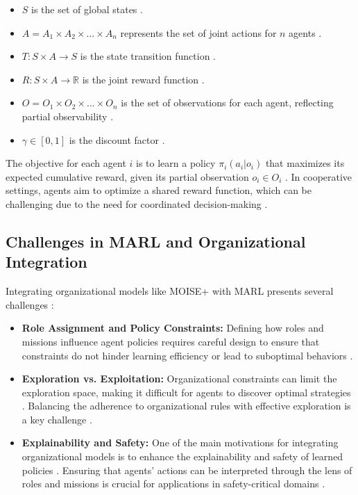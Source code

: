 \documentclass[sigconf,anonymous]{aamas}
\begin{document}
\begin{itemize}
    \item $S$ is the set of global states \cite{oliehoek2016concise}.
    \item $A = A_1 \times A_2 \times ... \times A_n$ represents the set of joint actions for $n$ agents \cite{foerster2018counterfactual}.
    \item $T: S \times A \rightarrow S$ is the state transition function \cite{foerster2016learning}.
    \item $R: S \times A \rightarrow \mathbb{R}$ is the joint reward function \cite{lowe2017multi}.
    \item $O = O_1 \times O_2 \times ... \times O_n$ is the set of observations for each agent, reflecting partial observability \cite{oliehoek2016concise}.
    \item $\gamma \in [0,1]$ is the discount factor \cite{lowe2017multi}.
\end{itemize}

The objective for each agent $i$ is to learn a policy $\pi_i(a_i | o_i)$ that maximizes its expected cumulative reward, given its partial observation $o_i \in O_i$ \cite{foerster2016learning}. In cooperative settings, agents aim to optimize a shared reward function, which can be challenging due to the need for coordinated decision-making \cite{oliehoek2016concise, foerster2018counterfactual}.

\subsection{Challenges in MARL and Organizational Integration}
Integrating organizational models like MOISE+ with MARL presents several challenges \cite{hubner2010moise, soule2024}:

\begin{itemize}
    \item \textbf{Role Assignment and Policy Constraints:} Defining how roles and missions influence agent policies requires careful design to ensure that constraints do not hinder learning efficiency or lead to suboptimal behaviors \cite{hubner2010moise, su2021toward}.
    \item \textbf{Exploration vs. Exploitation:} Organizational constraints can limit the exploration space, making it difficult for agents to discover optimal strategies \cite{hernandez2019survey}. Balancing the adherence to organizational rules with effective exploration is a key challenge \cite{yang2018mean}.
    \item \textbf{Explainability and Safety:} One of the main motivations for integrating organizational models is to enhance the explainability and safety of learned policies \cite{ghosal2021explainable}. Ensuring that agents' actions can be interpreted through the lens of roles and missions is crucial for applications in safety-critical domains \cite{bastani2018verifiable, camara2020symbolic}.
\end{itemize}
\end{document}
